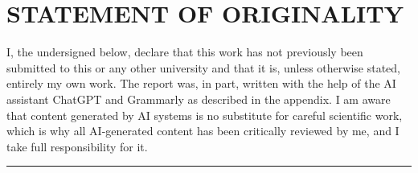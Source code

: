 \documentclass[../report.tex]{subfiles}
\begin{document}
    \section*{STATEMENT OF ORIGINALITY}

 
    \noindent I, the undersigned below, declare that this work has not previously been submitted to this or any other university and that it is, unless otherwise stated, entirely my own work. The report was, in part, written with the help of the AI assistant ChatGPT and Grammarly as described in the appendix. I am aware that content generated by AI systems is no substitute for careful scientific work, which is why all AI-generated content has been critically reviewed by me, and I take full responsibility for it.

    \vspace{1cm}

    \hrule width 0.45\linewidth
    \hfill \hspace{0.025\linewidth}
    \hrulefill

\end{document}
